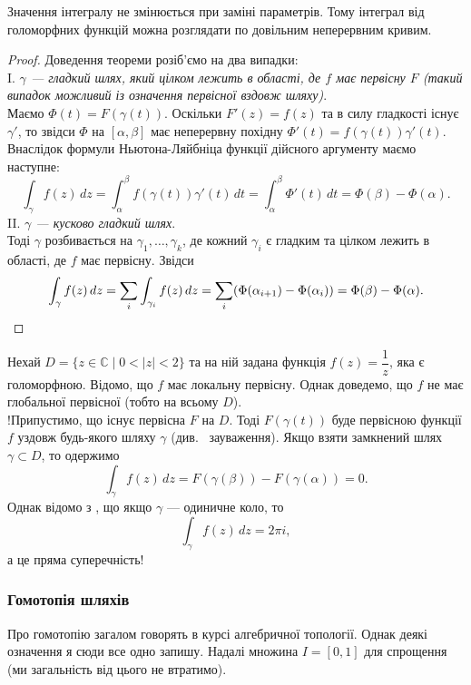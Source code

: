 \documentclass{math_library}
\begin{document}
\begin{remark}
Значення інтегралу не змінюється при заміні параметрів. Тому інтеграл від голоморфних функцій можна розглядати по довільним неперервним кривим.
\end{remark}

\begin{proof}
Доведення теореми розіб'ємо на два випадки:
\bigskip \\
I. \textit{$\gamma$ --- гладкий шлях, який цілком лежить в області, де $f$ має первісну $F$ (такий випадок можливий із означення первісної вздовж шляху)}.\\
Маємо $\Phi(t) = F(\gamma(t))$. Оскільки $F'(z) = f(z)$ та в силу гладкості існує $\gamma'$, то звідси $\Phi$ на $[\alpha,\beta]$ має неперервну похідну $\Phi'(t) = f(\gamma(t)) \gamma'(t)$. Внаслідок формули Ньютона-Ляйбніца функції дійсного аргументу маємо наступне:
\[
\int_\gamma f(z)\,dz = \int_\alpha^\beta f(\gamma(t)) \gamma'(t)\,dt = \int_\alpha^\beta \Phi'(t)\,dt = \Phi(\beta) - \Phi(\alpha).
\]
II. \textit{$\gamma$ --- кусково гладкий шлях}.\\
Тоді $\gamma$ розбивається на $\gamma_1,\dots,\gamma_k$, де кожний $\gamma_i$ є гладким та цілком лежить в області, де $f$ має первісну. Звідси
\[
\int_\gamma f(z)\,dz = \sum_{i} \int_{\gamma_i} f(z)\,dz = \sum_i (\Phi(\alpha_{i+1}) - \Phi(\alpha_i)) = \Phi(\beta) - \Phi(\alpha). \qedhere
\]
\end{proof}

\begin{example}
Нехай $D = \{z \in \mathbb{C} \mid 0 < |z| < 2\}$ та на ній задана функція $f(z) = \dfrac{1}{z}$, яка є голоморфною. Відомо, що $f$ має локальну первісну. Однак доведемо, що $f$ не має глобальної первісної (тобто на всьому $D$).
\bigskip \\
!Припустимо, що існує первісна $F$ на $D$. Тоді $F(\gamma(t))$ буде первісною функції $f$ уздовж будь-якого шляху $\gamma$ (див.~ зауваження). Якщо взяти замкнений шлях $\gamma \subset D$, то одержимо
\[
\int_\gamma f(z)\,dz = F(\gamma(\beta)) - F(\gamma(\alpha)) = 0.
\]
Однак відомо з , що якщо $\gamma$ --- одиничне коло, то
\[
\int_\gamma f(z)\,dz = 2 \pi i,
\]
а це пряма суперечність!
\end{example}

\subsubsection{Гомотопія шляхів}
Про гомотопію загалом говорять в курсі алгебричної топології. Однак деякі означення я сюди все одно запишу. Надалі множина $I = [0,1]$ для спрощення (ми загальність від цього не втратимо).
\end{document}
